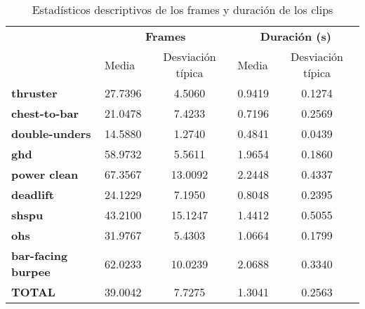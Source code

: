 \begin{table}[H]
\centering
\caption{Estadísticos descriptivos de los frames y duración de los clips}
\label{table_descriptive_stats}
\begin{tabular}{l|lc|lc}
\toprule
{} & \multicolumn{2}{c|}{\textbf{Frames}} & \multicolumn{2}{c}{\textbf{Duración (s)}} \\
{} &    Media & Desviación típica &        Media & Desviación típica \\
\midrule
\textbf{thruster}          &  27.7396 &            4.5060 &       0.9419 &            0.1274 \\
\textbf{chest-to-bar}      &  21.0478 &            7.4233 &       0.7196 &            0.2569 \\
\textbf{double-unders}     &  14.5880 &            1.2740 &       0.4841 &            0.0439 \\
\textbf{ghd}               &  58.9732 &            5.5611 &       1.9654 &            0.1860 \\
\textbf{power clean}       &  67.3567 &           13.0092 &       2.2448 &            0.4337 \\
\textbf{deadlift}          &  24.1229 &            7.1950 &       0.8048 &            0.2395 \\
\textbf{shspu}             &  43.2100 &           15.1247 &       1.4412 &            0.5055 \\
\textbf{ohs}               &  31.9767 &            5.4303 &       1.0664 &            0.1799 \\
\textbf{bar-facing burpee} &  62.0233 &           10.0239 &       2.0688 &            0.3340 \\
\textbf{TOTAL}             &  39.0042 &           7.7275  &       1.3041 &            0.2563 \\
\bottomrule
\end{tabular}
\end{table}
